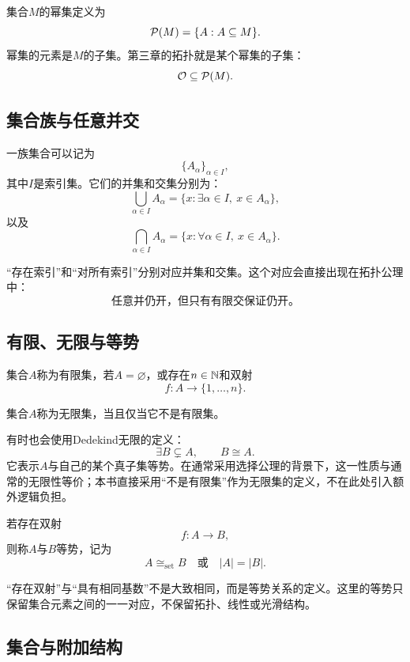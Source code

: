 \begin{definition}[幂集]
集合$M$的幂集定义为
\[
    \P(M)=\{A:A\subseteq M\}.
\]
幂集的元素是$M$的子集。第三章的拓扑就是某个幂集的子集：
\[
    \mathcal O\subseteq\P(M).
\]
\end{definition}

\subsection{集合族与任意并交}

一族集合可以记为
\[
    \{A_\alpha\}_{\alpha\in I},
\]
其中$I$是索引集。它们的并集和交集分别为：
\[
    \bigcup_{\alpha\in I}A_\alpha
    =
    \{x:\exists\alpha\in I,\ x\in A_\alpha\},
\]
以及
\[
    \bigcap_{\alpha\in I}A_\alpha
    =
    \{x:\forall\alpha\in I,\ x\in A_\alpha\}.
\]

“存在索引”和“对所有索引”分别对应并集和交集。这个对应会直接出现在拓扑公理中：
\[
    \text{任意并仍开，但只有有限交保证仍开。}
\]

\subsection{有限、无限与等势}

\begin{definition}[有限集]
集合$A$称为有限集，若$A=\varnothing$，或存在$n\in\N$和双射
\[
    f:A\to\{1,\ldots,n\}.
\]
\end{definition}

\begin{definition}[无限集]
集合$A$称为无限集，当且仅当它不是有限集。
\end{definition}

有时也会使用Dedekind无限的定义：
\[
    \exists B\subsetneq A,\qquad B\cong A.
\]
它表示$A$与自己的某个真子集等势。在通常采用选择公理的背景下，这一性质与通常的无限性等价；本书直接采用“不是有限集”作为无限集的定义，不在此处引入额外逻辑负担。

\begin{definition}[等势]
若存在双射
\[
    f:A\to B,
\]
则称$A$与$B$等势，记为
\[
    A\cong_{\mathrm{set}}B
    \quad\text{或}\quad
    |A|=|B|.
\]
\end{definition}

“存在双射”与“具有相同基数”不是大致相同，而是等势关系的定义。这里的等势只保留集合元素之间的一一对应，不保留拓扑、线性或光滑结构。

\subsection{集合与附加结构}

